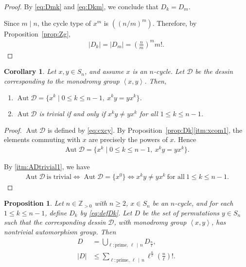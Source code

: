 \documentclass[12pt,reqno]{amsart}
\newcommand{\msD}{\mathscr{D}}
\newcommand{\Zp}{\mathbb{Z}_{> 0}}						%
\newcommand{\f}[2]{\frac{#1}{#2}}							%
\newcommand{\vt}[1]{\left\lvert #1 \right\rvert}					%
\newcommand{\gen}[1]{\left\langle #1 \right\rangle}				%
\DeclareMathOperator{\Aut}{Aut}							%
\theoremstyle{mythmstyle}
\newtheorem{prop}[lemma]{Proposition}
\newtheorem{cor}[lemma]{Corollary}
\theoremstyle{mydefstyle}
\newcommand{\propref}[1]{Proposition~\ref{#1}}
\newcommand{\AD}{\Aut{\msD}}
\numberwithin{equation}{section}
\begin{document}
\begin{proof}
By \eqref{eq:Dmk} and \eqref{eq:Dkm}, we conclude that $D_{k} = D_{m}$.

Since $m \mid n$, the cycle type of $x^{m}$ is $((n/m)^{m})$. Therefore, by \propref{prop:Zg},
\begin{align}
\vt{D_{k}} = \vt{D_{m}} = \left(\f{n}{m}\right)^{m} m!.
\end{align}
\end{proof}

\begin{cor}
\label{cor:ADtrivial}
Let $x, y \in S_{n}$, and assume $x$ is an $n$-cycle. Let $\msD$ be the dessin corresponding to the monodromy
group $\gen{x, y}$. Then,
\begin{enumerate}
\item \label{itm:ADtrivial1} $\AD = \{ x^{k} \mid 0 \le k \le n-1,\ x^{k}y = yx^{k} \}$.
\item \label{itm:ADtrivial2} $\AD$ is trivial if and only if $x^{k}y \ne yx^{k}$ for all $1 \le k \le n-1$.
\end{enumerate}
\end{cor}

\begin{proof}
\item[\ref{itm:ADtrivial1}] $\AD$ is defined by \eqref{eq:cxcy}. By \propref{prop:Dk}\ref{itm:xcom1}, the elements commuting with $x$
are precisely the powers of $x$. Hence
\begin{align}
\AD = \{ x^{k} \mid 0 \le k \le n-1,\ x^{k}y = yx^{k} \}.
\end{align}

\item[\ref{itm:ADtrivial2}] By \ref{itm:ADtrivial1}, we have
\begin{align}
\AD\ \text{is trivial} \iff \AD = \{ x^{0} \} \iff x^{k}y \ne yx^{k}\ \text{for all}\ 1 \le k \le n-1.
\end{align}
\end{proof}

\begin{prop}
\label{prop:D}
Let $n \in \Zp$ with $n \ge 2$, $x \in S_{n}$ be an $n$-cycle, and for each $1 \le k \le n-1$, define $D_{k}$ by \eqref{eq:defDk}.
Let $D$ be the set of permutations $y \in S_{n}$ such that the corresponding dessin $\msD$,
with monodromy group $\gen{x,y}$, has nontrivial automorphism group. Then
\begin{align}
D &= \bigcup_{\ell\colon \text{prime},\, \ell\, \mid\, n} D_{\f{n}{\ell}}, \\
\label{eq:vtD}
\vt{D} &\le \sum_{\ell\colon \text{prime},\, \ell\, \mid\, n} \ell^{\f{n}{\ell}}\left(\f{n}{\ell}\right)!.
\end{align}
\end{prop}
\end{document}
